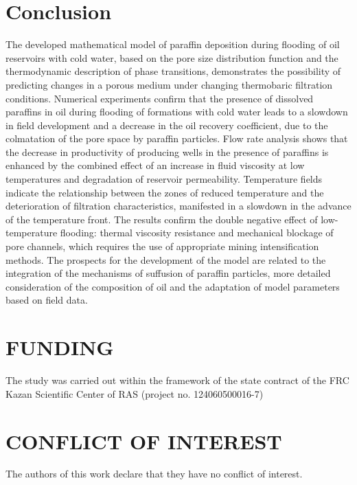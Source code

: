 \documentclass[
11pt,%
tightenlines,%
twoside,%
onecolumn,%
nofloats,%
nobibnotes,%
nofootinbib,%
superscriptaddress,%
noshowpacs,%
centertags]%
{revtex4-2}
\begin{document}
\section{Conclusion}
	The developed mathematical model of paraffin deposition during flooding of oil reservoirs with cold water, based on the pore size distribution function and the thermodynamic description of phase transitions, demonstrates the possibility of predicting changes in a porous medium under changing thermobaric filtration conditions. Numerical experiments confirm that the presence of dissolved paraffins in oil during flooding of formations with cold water leads to a slowdown in field development and a decrease in the oil recovery coefficient, due to the colmatation of the pore space by paraffin particles. Flow rate analysis shows that the decrease in productivity of producing wells in the presence of paraffins is enhanced by the combined effect of an increase in fluid viscosity at low temperatures and degradation of reservoir permeability. Temperature fields indicate the relationship between the zones of reduced temperature and the deterioration of filtration characteristics, manifested in a slowdown in the advance of the temperature front. The results confirm the double negative effect of low-temperature flooding: thermal viscosity resistance and mechanical blockage of pore channels, which requires the use of appropriate mining intensification methods. The prospects for the development of the model are related to the integration of the mechanisms of suffusion of paraffin particles, more detailed consideration of the composition of oil and the adaptation of model parameters based on field data.



\section*{FUNDING}
The study was carried out within the framework of the state contract of the FRC Kazan Scientific Center of RAS (project no. 124060500016-7)

\section*{CONFLICT OF INTEREST}
The authors of this work declare that they have no conflict of interest.
\end{document}
